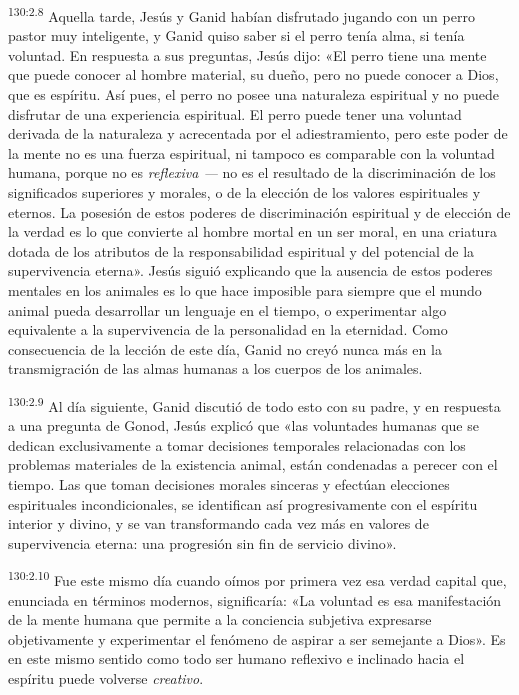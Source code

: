 \par
\textsuperscript{130:2.8} Aquella tarde, Jesús y Ganid habían disfrutado jugando con un perro pastor muy inteligente, y Ganid quiso saber si el perro tenía alma, si tenía voluntad. En respuesta a sus preguntas, Jesús dijo: «El perro tiene una mente que puede conocer al hombre material, su dueño, pero no puede conocer a Dios, que es espíritu. Así pues, el perro no posee una naturaleza espiritual y no puede disfrutar de una experiencia espiritual. El perro puede tener una voluntad derivada de la naturaleza y acrecentada por el adiestramiento, pero este poder de la mente no es una fuerza espiritual, ni tampoco es comparable con la voluntad humana, porque no es \textit{reflexiva ---} no es el resultado de la discriminación de los significados superiores y morales, o de la elección de los valores espirituales y eternos. La posesión de estos poderes de discriminación espiritual y de elección de la verdad es lo que convierte al hombre mortal en un ser moral, en una criatura dotada de los atributos de la responsabilidad espiritual y del potencial de la supervivencia eterna». Jesús siguió explicando que la ausencia de estos poderes mentales en los animales es lo que hace imposible para siempre que el mundo animal pueda desarrollar un lenguaje en el tiempo, o experimentar algo equivalente a la supervivencia de la personalidad en la eternidad. Como consecuencia de la lección de este día, Ganid no creyó nunca más en la transmigración de las almas humanas a los cuerpos de los animales.

\par
\textsuperscript{130:2.9} Al día siguiente, Ganid discutió de todo esto con su padre, y en respuesta a una pregunta de Gonod, Jesús explicó que «las voluntades humanas que se dedican exclusivamente a tomar decisiones temporales relacionadas con los problemas materiales de la existencia animal, están condenadas a perecer con el tiempo. Las que toman decisiones morales sinceras y efectúan elecciones espirituales incondicionales, se identifican así progresivamente con el espíritu interior y divino, y se van transformando cada vez más en valores de supervivencia eterna: una progresión sin fin de servicio divino».

\par
\textsuperscript{130:2.10} Fue este mismo día cuando oímos por primera vez esa verdad capital que, enunciada en términos modernos, significaría: «La voluntad es esa manifestación de la mente humana que permite a la conciencia subjetiva expresarse objetivamente y experimentar el fenómeno de aspirar a ser semejante a Dios». Es en este mismo sentido como todo ser humano reflexivo e inclinado hacia el espíritu puede volverse \textit{creativo}.

